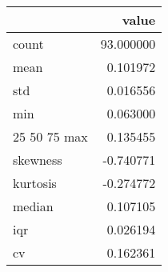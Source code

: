 \begin{tabular}{lr}
\toprule
 & value \\
\midrule
count & 93.000000 \\
mean & 0.101972 \\
std & 0.016556 \\
min & 0.063000 \\
25%
50%
75%
max & 0.135455 \\
skewness & -0.740771 \\
kurtosis & -0.274772 \\
median & 0.107105 \\
iqr & 0.026194 \\
cv & 0.162361 \\
\bottomrule
\end{tabular}
